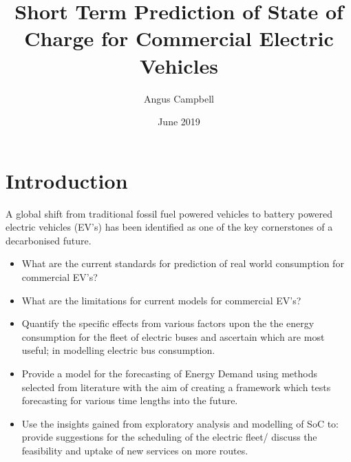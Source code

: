 \documentclass{article}
\title{Short Term Prediction of State of Charge for Commercial Electric Vehicles}
\author{Angus Campbell}
\date{June 2019}
\begin{document}
\maketitle
\tableofcontents

\newpage
\begin{abstract}
    
\end{abstract}

\section{Introduction}







A global shift from traditional fossil fuel powered vehicles to battery powered electric vehicles (EV's) has been identified as one of the key cornerstones of a decarbonised future. 
\begin{itemize}
    \item What are the current standards for prediction of real world consumption for commercial EV's?
    \item What are the limitations for current models for commercial EV's?
    \item Quantify the specific effects from various factors upon the the energy consumption for the fleet of electric buses and ascertain which are most useful; in modelling electric bus consumption.
    \item Provide a model for the forecasting of Energy Demand using methods selected from literature with the aim of creating a framework which tests forecasting for various time lengths into the future.
    \item Use the insights gained from exploratory analysis and modelling of SoC to: provide suggestions for the scheduling of the electric fleet/ discuss the feasibility and uptake of new services on more routes.
\end{itemize}
\end{document}
